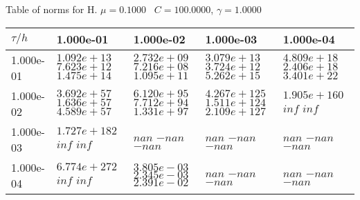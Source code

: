 \begin{center}
Table of norms for H. $\mu = 0.1000$ \, $C = 100.0000$, $\gamma = 1.0000$
  
\begin{tabular}{|p{1in}|p{1in}|p{1in}|p{1in}|p{1in}|} \hline
$\tau / h$ &1.000e-01 &1.000e-02 &1.000e-03 &1.000e-04 \\ \hline 
1.000e-01 & $1.092e+13$  $7.623e+12$  $1.475e+14$  & $2.732e+09$  $7.216e+08$  $1.095e+11$  & $3.079e+13$  $3.724e+12$  $5.262e+15$  & $4.809e+18$  $2.406e+18$  $3.401e+22$  \\ \hline 
1.000e-02 & $3.692e+57$  $1.636e+57$  $4.589e+57$  & $6.120e+95$  $7.712e+94$  $1.331e+97$  & $4.267e+125$  $1.511e+124$  $2.109e+127$  & $1.905e+160$  $inf$  $inf$  \\ \hline 
1.000e-03 & $1.727e+182$  $inf$  $inf$  & $nan$  $-nan$  $-nan$  & $nan$  $-nan$  $-nan$  & $nan$  $-nan$  $-nan$  \\ \hline 
1.000e-04 & $6.774e+272$  $inf$  $inf$  & $3.805e-03$  $2.345e-03$  $2.391e-02$  & $nan$  $-nan$  $-nan$  & $nan$  $-nan$  $-nan$  \\ \hline 

\end{tabular}\\[20pt]
\end{center}
